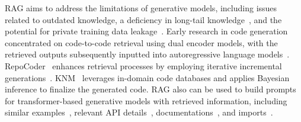 RAG aims to address the limitations of generative models, including issues related to outdated knowledge, a deficiency in long-tail knowledge~\cite{mallen2022not}, and the potential for private training data leakage~\cite{carlini2021extracting}.
Early research in code generation concentrated on code-to-code retrieval using dual encoder models, with the retrieved outputs subsequently inputted into autoregressive language models~\cite{lu2022reacc}. 
RepoCoder~\cite{zhang2023repocoder} enhances retrieval processes by employing iterative incremental generations~\cite{chu2011contextual}.
KNM~\cite{tang2023domain} leverages in-domain code databases and applies Bayesian inference to finalize the generated code.
RAG also can be used to build prompts for transformer-based generative models with retrieved information, including similar examples~\cite{parvez2021retrieval, li2023acecoder}, relevant API details~\cite{zan2022language, zan2023private}, documentations~\cite{zhou2022docprompting}, and imports~\cite{liu2023codegen4libs}.